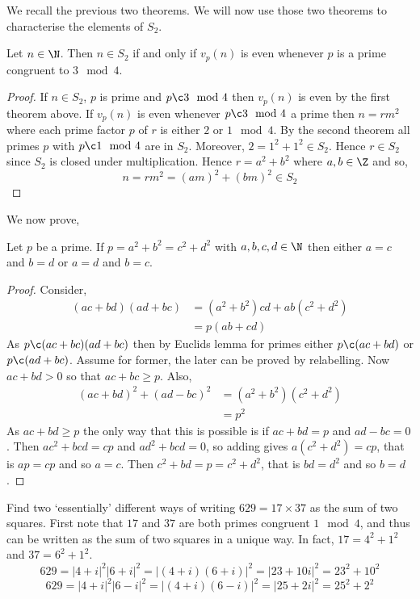 
\noindent
We recall the previous two theorems. We will now use those two theorems to characterise the elements of $S_2$.
\begin{nthm}
  Let $n \in \N$. Then $n \in S_2$ if and only if $v_p(n)$ is even whenever $p$ is a prime congruent to $3 \mod 4$.
\end{nthm}
\begin{proof}
  If $n \in S_2$, $p$ is prime and $p \c 3 \mod 4$ then $v_p(n)$ is even by the first theorem above. If $v_p(n)$ is even whenever $p \c 3 \mod 4$ a prime then $n = rm^2$ where each prime factor $p$ of $r$ is either $2$ or $1 \mod 4$. By the second theorem all primes $p$ with $p \c 1 \mod 4$ are in $S_2$. Moreover, $2 = 1^2 + 1^2 \in S_2$.
  Hence $r \in S_2$ since $S_2$ is closed under multiplication. Hence $r = a^2 + b^2$ where $a,b \in \Z$ and so,
  $$ n = rm^2 = (am)^2 + (bm)^2 \in S_2 $$
\end{proof}

\noindent
We now prove,
\begin{nthm}
  Let $p$ be a prime. If $p = a^2 + b^2 = c^2 + d^2$ with $a, b, c, d \in \N$ then either $a=c$ and $b=d$ or $a=d$ and $b = c$.
\end{nthm}
\begin{proof}
  Consider,
  \begin{align*}
    (ac + bd)(ad + bc) &= (a^2 + b^2)cd + ab(c^2 + d^2) \\
    &= p(ab + cd)
  \end{align*}
  As $p \c (ac + bc)(ad + bc)$ then by Euclids lemma for primes either $p \c (ac + bd)$ or $p\c (ad + bc)$. Assume for former, the later can be proved by relabelling. Now $ac + bd > 0$ so that $ac + bc \ge p$. Also,
  \begin{align*}
    (ac +bd)^2 + (ad- bc)^2 &= (a^2 + b^2)(c^2 + d^2)\\
    &= p^2
  \end{align*}
  As $ac + bd \ge p$ the only way that this is possible is if $ac + bd = p$ and $ad - bc = 0$. Then $ac^2 + bcd = cp$ and $ad^2 + bcd = 0$, so adding gives $a(c^2 + d^2) = cp$, that is $ap = cp$ and so $a = c$. Then $c^2 + bd = p = c^2 + d^2$, that is $bd = d^2$ and so $b = d$.
\end{proof}

\begin{eg}
  Find two `essentially' different ways of writing $629 = 17 \times 37$ as the sum of two squares. First note that $17$ and $37$ are both primes congruent $1\mod 4$, and thus can be written as the sum of two squares in a unique way. In fact, $17 = 4^2 + 1^2$ and $37 = 6^2 + 1^2$.
  $$ 629 = |4 + i|^2|6 + i|^2 = |(4 + i)(6 + i)|^2 = |23 + 10i|^2 = 23^2 + 10^2 $$
  $$ 629 = |4 + i|^2|6 - i|^2 = |(4 + i)(6 - i)|^2 = |25 + 2i|^2 = 25^2 + 2^2 $$
\end{eg}

